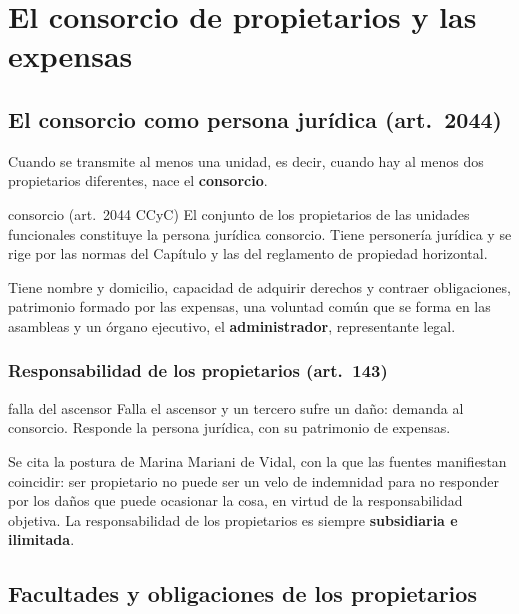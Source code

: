 \documentclass[12pt,oneside]{book}
\begin{document}
\chapter[El consorcio y las expensas]{El consorcio de propietarios y las expensas}\label{cap:consorcio}

\section{El consorcio como persona jurídica (art.~2044)}

Cuando se transmite al menos una unidad, es decir, cuando hay al menos dos propietarios diferentes, nace el \textbf{consorcio}.

\begin{definicion}{consorcio (art.~2044 CCyC)}
El conjunto de los propietarios de las unidades funcionales constituye la persona jurídica consorcio. Tiene personería jurídica y se rige por las normas del Capítulo y las del reglamento de propiedad horizontal.
\end{definicion}

Tiene nombre y domicilio, capacidad de adquirir derechos y contraer obligaciones, patrimonio formado por las expensas, una voluntad común que se forma en las asambleas y un órgano ejecutivo, el \textbf{administrador}, representante legal.

\subsection{Responsabilidad de los propietarios (art.~143)}

\begin{ejemplo}{falla del ascensor}
Falla el ascensor y un tercero sufre un daño: demanda al consorcio. Responde la persona jurídica, con su patrimonio de expensas.
\end{ejemplo}

Se cita la postura de Marina Mariani de Vidal, con la que las fuentes manifiestan coincidir: ser propietario no puede ser un velo de indemnidad para no responder por los daños que puede ocasionar la cosa, en virtud de la responsabilidad objetiva. La responsabilidad de los propietarios es siempre \textbf{subsidiaria e ilimitada}.

\section{Facultades y obligaciones de los propietarios}
\end{document}
